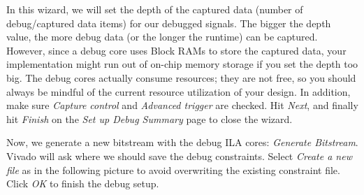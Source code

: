 \documentclass[11pt]{article}
\begin{document}
\begin{center}
\end{center}

In this wizard, we will set the depth of the captured data (number of debug/captured data items) for our debugged signals. The bigger the depth value, the more debug data (or the longer the runtime) can be captured. However, since a debug core uses Block RAMs to store the captured data, your implementation might run out of on-chip memory storage if you set the depth too big. The debug cores actually consume resources; they are not free, so you should always be mindful of the current resource utilization of your design. In addition, make sure \emph{Capture control} and \emph{Advanced trigger} are checked. Hit \emph{Next}, and finally hit \emph{Finish} on the \textit{Set up Debug Summary} page to close the wizard.

\begin{center}
\end{center}
Now, we generate a new bitstream with the debug ILA cores: \emph{Generate Bitstream}. Vivado will ask where we should save the debug constraints. Select \emph{Create a new file} as in the following picture to avoid overwriting the existing constraint file. Click \emph{OK} to finish the debug setup. 
\end{document}
